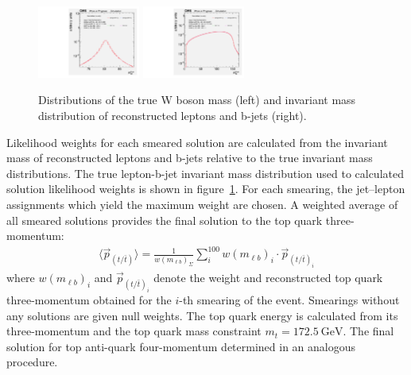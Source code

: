 \begin{figure}[!htb]
    \begin{center}
        \includegraphics[width=0.30\textwidth]{fig_fullRun2UL/SmearingPlots/ULcomp_KinReco_W_mass_step0.pdf}
        \includegraphics[width=0.30\textwidth]{fig_fullRun2UL/SmearingPlots/ULcomp_KinReco_mbl_true_step0.pdf}
        \caption{\small Distributions of the true W boson mass (left) and invariant mass distribution of reconstructed leptons and b-jets (right).}
       \label{fig:inputDists}
    \end{center}
\end{figure}

Likelihood weights for each smeared solution are calculated from the invariant mass of reconstructed leptons and b-jets relative to the true invariant mass distributions.
The true lepton-b-jet invariant mass distribution used to calculated solution likelihood weights is shown in figure~\ref{fig:inputDists}.
For each smearing, the jet--lepton assignments which yield the maximum weight are chosen.
A weighted average of all smeared solutions provides the final solution to the top quark three-momentum:
\begin{align}
\langle \vec{p}_{(t / \bar{t})} \rangle = \frac{1}{w(m_{\ell b})_{\Sigma}} \sum_i^{100} w(m_{\ell b})_i \cdot \vec{p}_{(t / \bar{t})_i}
\end{align}
where $w(m_{\ell b})_i$ and $\vec{p}_{{(t / \bar{t})}_i}$ denote the weight and reconstructed top quark three-momentum obtained for the $i$-th smearing of the event.
Smearings without any solutions are given null weights.
The top quark energy is calculated from its three-momentum and the top quark mass constraint $m_{t} = \SI{172.5}{\GeV}$.
The final solution for top anti-quark four-momentum determined in an analogous procedure.

